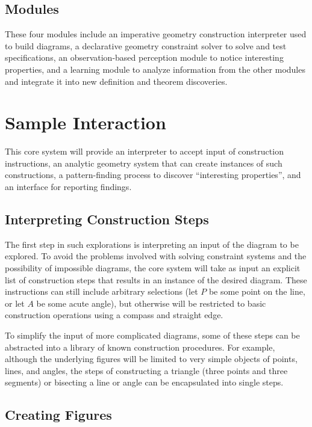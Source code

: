 \subsection{Modules}

These four modules include an imperative geometry construction
interpreter used to build diagrams, a declarative geometry constraint
solver to solve and test specifications, an observation-based
perception module to notice interesting properties, and a learning
module to analyze information from the other modules and integrate it
into new definition and theorem discoveries.

\section{Sample Interaction}

This core system will provide an interpreter to accept input of
construction instructions, an analytic geometry system that can create
instances of such constructions, a pattern-finding process to discover
``interesting properties'', and an interface for reporting findings.

\subsection{Interpreting Construction Steps}

The first step in such explorations is interpreting an input of the
diagram to be explored.  To avoid the problems involved with solving
constraint systems and the possibility of impossible diagrams, the
core system will take as input an explicit list of construction steps
that results in an instance of the desired diagram.  These
instructions can still include arbitrary selections (let $P$ be some
point on the line, or let $A$ be some acute angle), but otherwise will
be restricted to basic construction operations using a compass and
straight edge.

To simplify the input of more complicated diagrams, some of these
steps can be abstracted into a library of known construction
procedures.  For example, although the underlying figures will be
limited to very simple objects of points, lines, and angles, the steps
of constructing a triangle (three points and three segments) or
bisecting a line or angle can be encapsulated into single steps.

\subsection{Creating Figures}

